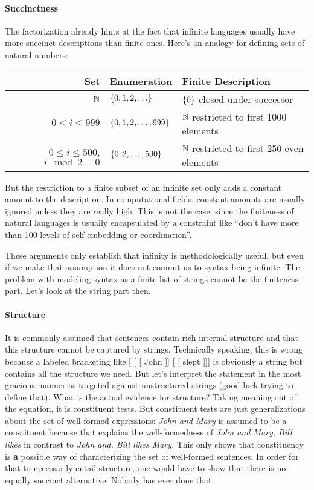 \paragraph{Succinctness}
%
The factorization already hints at the fact that infinite languages usually have more succinct descriptions than finite ones.
Here's an analogy for defining sets of natural numbers:
%
\begin{center}
    \begin{tabular}{rll}
        \toprule
        \textbf{Set}                        & \textbf{Enumeration}           & \textbf{Finite Description}\\
        \midrule
        $\mathbb{N}$                           & $\left \{ 0, 1, 2, \ldots \right \}$      & $\left \{ 0 \right \}$ closed under successor\\
        $0 \leq i \leq 999$                 & $\left \{ 0, 1, 2, \ldots, 999 \right \}$ & $\mathbb{N}$ restricted to first 1000 elements\\
        $0 \leq i \leq 500$, $i \mod 2 = 0$ & $\left \{ 0, 2, \ldots, 500 \right \}$    & $\mathbb{N}$ restricted to first 250 even elements\\
        \bottomrule
    \end{tabular}
\end{center}
%
But the restriction to a finite subset of an infinite set only adds a constant amount to the description.
In computational fields, constant amounts are usually ignored unless they are really high.
This is not the case, since the finiteness of natural languages is usually encapsulated by a constraint like ``don't have more than 100 levels of self-embedding or coordination''.

These arguments only establish that infinity is methodologically useful, but even if we make that assumption it does not commit us to syntax being infinite.
The problem with modeling syntax as a finite list of strings cannot be the finiteness-part.
Let's look at the string part then.

\paragraph{Structure}
%
It is commonly assumed that sentences contain rich internal structure and that this structure cannot be captured by strings.
Technically speaking, this is wrong because a labeled bracketing like [ [ [ John ]] [ [ slept ]]] is obviously a string but contains all the structure we need.
But let's interpret the statement in the most gracious manner as targeted against unstructured strings (good luck trying to define that).
What is the actual evidence for structure?
Taking meaning out of the equation, it is constituent tests.
But constituent tests are just generalizations about the set of well-formed expressions: \emph{John and Mary} is assumed to be a constituent because that explains the well-formedness of \emph{John and Mary, Bill likes} in contrast to \emph{John and, Bill likes Mary}.
This only shows that constituency is \textbf{a} possible way of characterizing the set of well-formed sentences.
In order for that to necessarily entail structure, one would have to show that there is no equally succinct alternative.
Nobody has ever done that.

